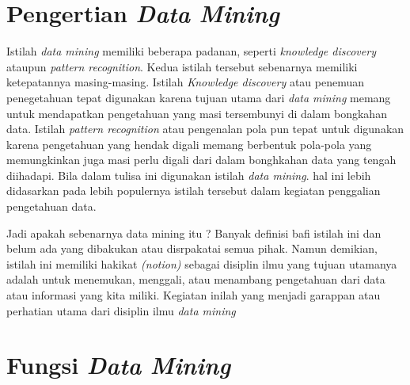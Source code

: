 \section{Pengertian \textit{Data Mining}}
Istilah \textit{data mining} memiliki beberapa padanan, seperti \textit{knowledge discovery} ataupun  \textit{pattern recognition}. Kedua istilah tersebut sebenarnya memiliki ketepatannya masing-masing. Istilah \textit{Knowledge discovery} atau penemuan penegetahuan tepat digunakan karena tujuan utama dari \textit{data mining} memang untuk mendapatkan pengetahuan yang masi tersembunyi di dalam bongkahan data. Istilah \textit{pattern recognition} atau pengenalan pola pun tepat untuk digunakan karena pengetahuan yang hendak digali memang berbentuk pola-pola yang memungkinkan juga masi perlu digali dari dalam bonghkahan data yang tengah diihadapi. Bila dalam tulisa ini digunakan istilah \textit{data mining}. hal ini lebih didasarkan pada lebih populernya istilah tersebut dalam kegiatan penggalian pengetahuan data\cite{susanto2010pengantar}.



\par Jadi apakah sebenarnya data mining itu ? Banyak definisi bafi istilah ini dan belum ada yang dibakukan atau disrpakatai semua pihak. Namun demikian, istilah ini memiliki hakikat \textit{(notion)} sebagai disiplin ilmu yang tujuan utamanya adalah untuk menemukan, menggali, atau menambang pengetahuan dari data atau informasi yang kita miliki. Kegiatan inilah yang menjadi garappan atau perhatian utama dari disiplin ilmu \textit{data mining}


\section{Fungsi \textit{Data Mining}}

